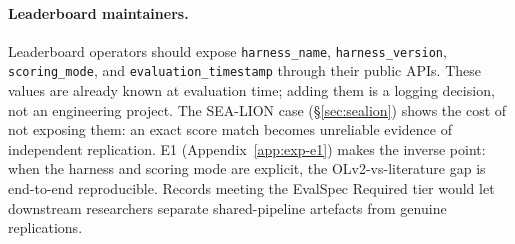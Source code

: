 \documentclass[11pt]{article}
\begin{document}
%
%
%

\paragraph{Leaderboard maintainers.}
Leaderboard operators should expose \texttt{harness\_name},
\texttt{harness\_version}, \texttt{scoring\_mode}, and
\texttt{evaluation\_timestamp} through their public APIs. These values are
already known at evaluation time; adding them is a logging decision, not
an engineering project. The SEA-LION case (\S\ref{sec:sealion}) shows the
cost of not exposing them: an exact score match becomes unreliable
evidence of independent replication. E1
(Appendix~\ref{app:exp-e1}) makes the inverse point: when the harness and
scoring mode are explicit, the OLv2-vs-literature gap is end-to-end
reproducible. Records meeting the EvalSpec Required tier would let
downstream researchers separate shared-pipeline artefacts from genuine
replications.
\end{document}
